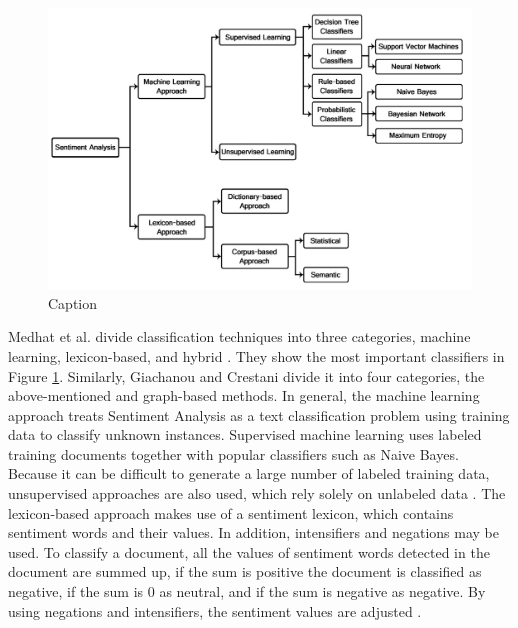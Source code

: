 \begin{figure}
    \centering
    \includegraphics[scale=0.3]{Images/classification_techniques.png}
    \caption{Caption}
    \label{fig:classifiers}
\end{figure}
Medhat et al. divide classification techniques into three categories, machine learning, lexicon-based, and hybrid \cite{MEDHAT20141093}. They show the most important classifiers in Figure \ref{fig:classifiers}. Similarly, Giachanou and Crestani divide it into four categories, the above-mentioned and graph-based methods\cite{DBLP:journals/csur/GiachanouC16}. In general, the machine learning approach treats Sentiment Analysis as a text classification problem using training data to classify unknown instances. Supervised machine learning uses labeled training documents together with popular classifiers such as Naive Bayes. Because it can be difficult to generate a large number of labeled training data, unsupervised approaches are also used, which rely solely on unlabeled data \cite{MEDHAT20141093}. The lexicon-based approach makes use of a sentiment lexicon, which contains sentiment words and their values. In addition, intensifiers and negations may be used. To classify a document, all the values of sentiment words detected in the document are summed up, if the sum is positive the document is classified as negative, if the sum is 0 as neutral, and if the sum is negative as negative. By using negations and intensifiers, the sentiment values are adjusted \cite{liu_2015}.







